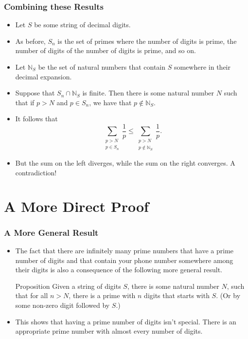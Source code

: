 \documentclass{beamer}
\begin{document}
\begin{frame}
    \frametitle{Combining these Results}

    \begin{itemize}
        \item Let $S$ be some string of decimal digits. \pause
        \item As before, $S_n$ is the set of primes where the number of digits is prime, the number of digits of the number of digits is prime, and so on. \pause
        \item Let $\mathbb{N}_S$ be the set of natural numbers that contain $S$ somewhere in their decimal expansion. \pause
        \item Suppose that $S_n \cap \mathbb{N}_S$ is finite. Then there is some natural number $N$ such that if $p > N$ and $p \in S_n$, we have that $p \not\in \mathbb{N}_S$. \pause
        \item It follows that
        \[
            \sum_{\substack{p > N\\ p \in S_n}} \frac{1}{p} \leq \sum_{\substack{p > N\\ p \not\in \mathbb{N}_S}} \frac{1}{p}.
        \]
        \pause
        \item But the sum on the left diverges, while the sum on the right converges. A contradiction!
    \end{itemize}

\end{frame}

\section{A More Direct Proof}

\begin{frame}
    \frametitle{A More General Result}

    \begin{itemize}
        \item The fact that there are infinitely many prime numbers that have a prime number of digits and that contain your phone number somewhere among their digits is also a consequence of the following more general result.
        \begin{block}{Proposition}
            Given a string of digits $S$, there is some natural number $N$, such that for all $n > N$, there is a prime with $n$ digits that starts with $S$. (Or by some non-zero digit followed by $S$.)
        \end{block} 
        \pause
        \item This shows that having a prime number of digits isn't special. There is an appropriate prime number with almost every number of digits.
    \end{itemize}

\end{frame}
\end{document}
